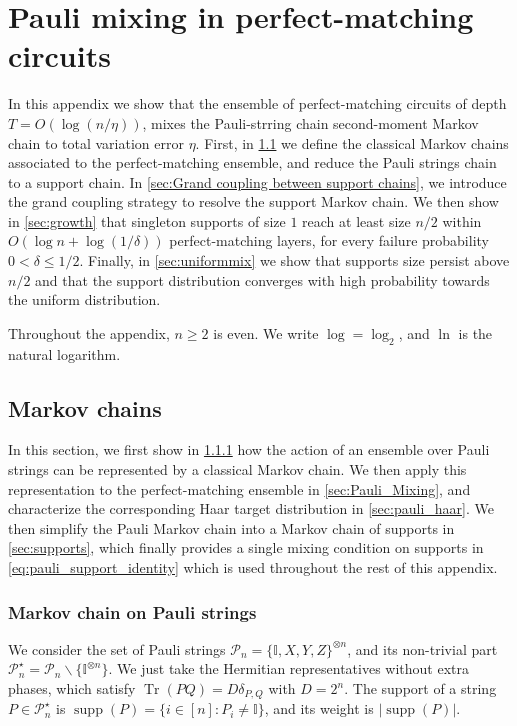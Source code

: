 \documentclass[
    aps,
    superscriptaddress,
    onecolumn,
    10pt,
    prx,
    nofootinbib
]{revtex4-2}
\theoremstyle{namedstatement}
\theoremstyle{plain}
\begin{document}
\newpage
\section{Pauli mixing in perfect-matching circuits} \label{app:PauliMixing}
In this appendix we show that the ensemble of perfect-matching circuits of depth $T=O(\log(n/\eta))$, mixes the Pauli-strring chain second-moment Markov chain to total variation error $\eta$. First, in \cref{sec:The Markov Chains} we define the classical Markov chains associated to the perfect-matching ensemble, and reduce the Pauli strings chain to a support chain. In \cref{sec:Grand coupling between support chains}, we introduce the grand coupling strategy to resolve the support Markov chain. We then show in \cref{sec:growth} that singleton supports of size $1$ reach at least size $n/2$ within $O(\log n +\log (1/\delta))$ perfect-matching layers, for every failure probability $0<\delta \leq 1/2$. Finally, in \cref{sec:uniformmix} we show that supports size persist above $n/2$ and that the support distribution converges with high probability towards the uniform distribution.

Throughout the appendix, $n\geq 2$ is even. We write $\log=\log_2$, and $\operatorname{ln}$ is the natural logarithm.

\subsection{Markov chains}\label{sec:The Markov Chains}
In this section, we first show in \cref{sec:The Markov Chain and Pauli strings} how the action of
an ensemble over Pauli strings can be represented by a classical Markov chain. We then apply this representation to the perfect-matching ensemble in \cref{sec:Pauli_Mixing}, and characterize the corresponding Haar target distribution in \cref{sec:pauli_haar}. We then simplify the Pauli Markov chain into a Markov chain of supports in \cref{sec:supports}, which finally provides a single mixing condition on supports in \cref{eq:pauli_support_identity} which is used throughout the rest of this appendix.

\subsubsection{Markov chain on Pauli strings}
\label{sec:The Markov Chain and Pauli strings}
We consider the set of Pauli strings $\mathcal{P}_n=\{\mathbb{I},X,Y,Z\}^{\otimes n}$, and its non-trivial part $\mathcal{P}^{\star}_n=\mathcal{P}_n \backslash \{\mathbb{I}^{\otimes n}\}$. We just take the Hermitian representatives without extra phases, which satisfy $\operatorname{Tr}(PQ)=D\delta_{P,Q}$ with $D=2^n$. The support of a string $P \in \mathcal{P}_n^{\star}$ is $\operatorname{supp}(P)=\{i\in [n]:P_i \neq \mathbb{I}\}$, and its weight is $|\operatorname{supp}(P)|$. 
\end{document}
